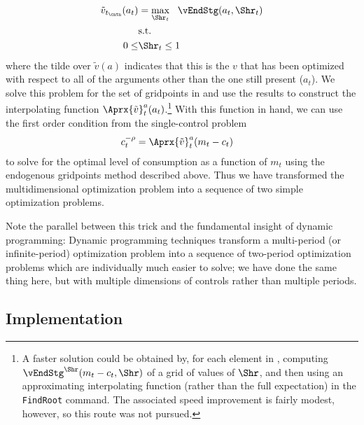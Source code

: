 \documentclass[titlepage, headings=optiontotocandhead]{Resources/texmf-local/tex/latex/econtex}
\begin{document}
\begin{equation}\begin{gathered}\begin{aligned}
      \tilde{v}_{{t_\cntn}}(a_{t})  & = \max_{\Shr_{t}} ~~  \vEndStg(a_{t},\Shr_{t})
      \\      & \text{s.t.} \nonumber
      \\      0 \leq & \Shr_{t} \leq 1
    \end{aligned}\end{gathered}\end{equation}
where the tilde over $\tilde{v}(a)$ indicates that this is the $v$ that has been optimized with respect to all of the arguments other than the one still present ($a_{t}$).  We solve this problem for the set of gridpoints in  and use the results to construct the interpolating function $\Aprx{\tilde{v}}_{t}^{a}(a_{t})$.\footnote{A faster solution could be obtained by, for each element in , computing $\vEndStg^{\Shr}(m_{t}-c_{t},\Shr)$ of a grid of values of $\Shr$, and then using an approximating interpolating function (rather than the full expectation) in the \texttt{FindRoot} command.  The associated speed improvement is fairly modest, however, so this route was not pursued.}  With this function in hand, we can use the first order condition from the single-control problem
\begin{equation*}\begin{gathered}\begin{aligned}
      c_{t}^{-\rho}  & = \Aprx{\tilde{v}}_{t}^{a}(m_{t}-c_{t})
    \end{aligned}\end{gathered}\end{equation*}
to solve for the optimal level of consumption as a function of $m_{t}$ using the endogenous gridpoints method described above.  Thus we have transformed the multidimensional optimization problem into a sequence of two simple optimization problems.

Note the parallel between this trick and the fundamental insight of dynamic programming: Dynamic programming techniques transform a multi-period (or infinite-period) optimization problem into a sequence of two-period optimization problems which are individually much easier to solve; we have done the same thing here, but with multiple dimensions of controls rather than multiple periods.

\hypertarget{implementation}{}
\subsection{Implementation}
\end{document}
